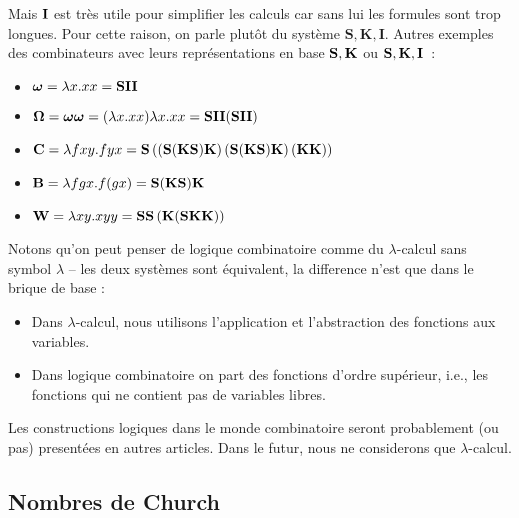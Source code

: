 Mais $\mathbf{I}$ est très utile pour simplifier les calculs car sans lui les formules sont trop longues. Pour cette raison, on parle plutôt du système $\mathbf{S, K, I}$.
Autres exemples des combinateurs avec leurs représentations en base $\mathbf{S}, \mathbf{K}$ ou $\mathbf{S}, \mathbf{K}, \mathbf{I}$~:
\begin{itemize}
	\item $\bm{\omega} = \lambda x. xx = \mathbf{S} \mathbf{I} \mathbf{I}$
	\item $\mathbf{\Omega} = \bm{\omega} \bm{\omega} = (\lambda x. xx) \lambda x. xx = \mathbf{S} \mathbf{I} \mathbf{I} (\mathbf{S} \mathbf{I} \mathbf{I})$
	\item $\mathbf{C}
		= \lambda fxy. fyx
		= \mathbf{S}
			\left(
				\left(\mathbf{S}(\mathbf{K}\mathbf{S})\mathbf{K}\right)
				\left(\mathbf{S}(\mathbf{K}\mathbf{S})\mathbf{K}\right)
				(\mathbf{K}\mathbf{K})
			\right)$
	\item $\mathbf{B} = \lambda fgx. f(gx) = \mathbf{S}(\mathbf{K}\mathbf{S})\mathbf{K}$
	\item $\mathbf{W} = \lambda xy. xyy = \mathbf{S} \mathbf{S} \left(\mathbf{K} (\mathbf{S} \mathbf{K} \mathbf{K})\right)$
\end{itemize}

Notons qu'on peut penser de logique combinatoire comme du $\lambda$-calcul sans symbol $\lambda$ -- les deux systèmes sont équivalent, la difference n'est que dans le brique de base :
\begin{itemize}
	\item Dans $\lambda$-calcul, nous utilisons l'application et l'abstraction des fonctions aux variables.
	\item Dans logique combinatoire on part des fonctions d'ordre supérieur, i.e., les fonctions qui ne contient pas de variables libres.
\end{itemize}
Les constructions logiques dans le monde combinatoire seront probablement (ou pas) presentées en autres articles.
Dans le futur, nous ne considerons que $\lambda$-calcul.

\subsection*{Nombres de Church}

